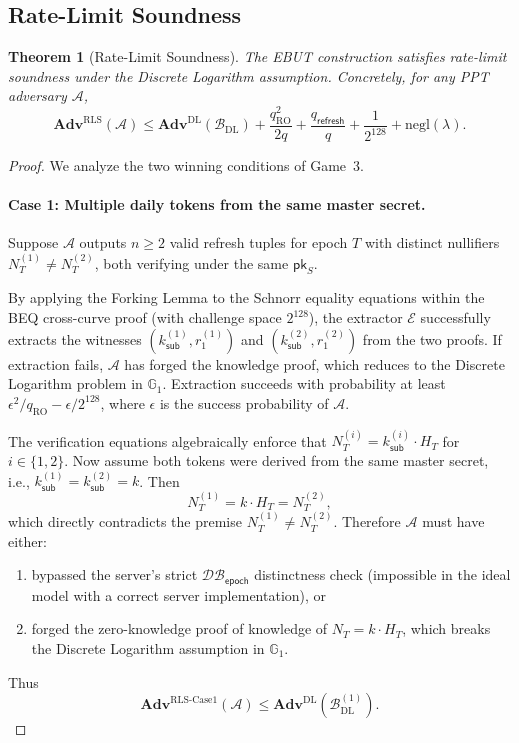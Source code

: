 \documentclass[11pt]{article}
\theoremstyle{definitionstyle}
\newtheorem{theorem}{Theorem}[section]
\theoremstyle{plain}
\newcommand{\advantage}[1]{\mathbf{Adv}^{\mathrm{#1}}}
\newcommand{\negl}{\mathrm{negl}}
\newcommand{\DB}{\mathcal{DB}}
\begin{document}
\subsection{Rate-Limit Soundness}

\begin{theorem}[Rate-Limit Soundness]
The EBUT construction satisfies rate-limit soundness under the Discrete Logarithm assumption. Concretely, for any PPT adversary $\mathcal{A}$,
\[
\advantage{RLS}(\mathcal{A}) \le \advantage{DL}(\mathcal{B}_{\text{DL}}) + \frac{q_{\text{RO}}^2}{2q} + \frac{q_{\mathsf{refresh}}}{q} + \frac{1}{2^{128}} + \negl(\lambda).
\]
\end{theorem}
\begin{proof}
We analyze the two winning conditions of Game~3.

\paragraph{Case 1: Multiple daily tokens from the same master secret.}
Suppose $\mathcal{A}$ outputs $n \ge 2$ valid refresh tuples for epoch $T$ with distinct nullifiers $N_T^{(1)} \neq N_T^{(2)}$, both verifying under the same $\mathsf{pk}_S$.

By applying the Forking Lemma to the Schnorr equality equations within the BEQ cross-curve proof (with challenge space $2^{128}$), the extractor $\mathcal{E}$ successfully extracts the witnesses $(k_{\mathsf{sub}}^{(1)}, r_1^{(1)})$ and $(k_{\mathsf{sub}}^{(2)}, r_1^{(2)})$ from the two proofs.  If extraction fails, $\mathcal{A}$ has forged the knowledge proof, which reduces to the Discrete Logarithm problem in $\mathbb{G}_1$.  Extraction succeeds with probability at least $\epsilon^2/q_{\text{RO}} - \epsilon/2^{128}$, where $\epsilon$ is the success probability of $\mathcal{A}$.

The verification equations algebraically enforce that $N_T^{(i)} = k_{\mathsf{sub}}^{(i)} \cdot H_T$ for $i \in \{1,2\}$.  Now assume both tokens were derived from the same master secret, i.e., $k_{\mathsf{sub}}^{(1)} = k_{\mathsf{sub}}^{(2)} = k$.  Then
\[
N_T^{(1)} = k \cdot H_T = N_T^{(2)},
\]
which directly contradicts the premise $N_T^{(1)} \neq N_T^{(2)}$.  Therefore $\mathcal{A}$ must have either:
\begin{enumerate}[leftmargin=*,nosep]
  \item bypassed the server's strict $\DB_{\mathsf{epoch}}$ distinctness check (impossible in the ideal model with a correct server implementation), or
  \item forged the zero-knowledge proof of knowledge of $N_T = k \cdot H_T$, which breaks the Discrete Logarithm assumption in $\mathbb{G}_1$.
\end{enumerate}
Thus
\[
\advantage{RLS\text{-Case1}}(\mathcal{A}) \le \advantage{DL}(\mathcal{B}_{\text{DL}}^{(1)}).
\]


\end{proof}
\end{document}
